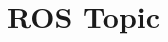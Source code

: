 \documentclass[11pt,fleqn]{book} %
\begin{document}
%
%
%
%
%
%
%
%
%
%


\chapter{ROS Topic}
\end{document}
